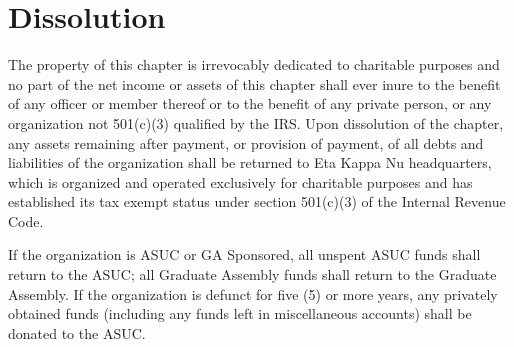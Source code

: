 \documentclass[11pt]{article}
\begin{document}
\section{Dissolution}
\label{sec:org090cd93}

The property of this chapter is irrevocably dedicated to charitable purposes and no part of the net income or assets of this chapter shall ever inure to the benefit of any officer or member thereof or to the benefit of any private person, or any organization not 501(c)(3) qualified by the IRS.
Upon dissolution of the chapter, any assets remaining after payment, or provision of payment, of all debts and liabilities of the organization shall be returned to Eta Kappa Nu headquarters, which is organized and operated exclusively for charitable purposes and has established its tax exempt status under section 501(c)(3) of the Internal Revenue Code.

If the organization is ASUC or GA Sponsored, all unspent ASUC funds shall return to the ASUC; all Graduate Assembly funds shall return to the Graduate Assembly.
If the organization is defunct for five (5) or more years, any privately obtained funds (including any funds left in miscellaneous accounts) shall be donated to the ASUC.
\end{document}
